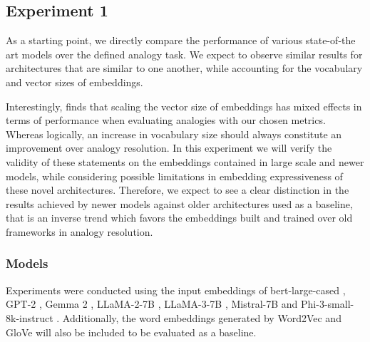 

\subsection{Experiment 1}

As a starting point, we directly compare the performance of various state-of-the art models over the defined analogy task.
We expect to observe similar results for architectures that are similar to one another, while accounting for the vocabulary and vector sizes of embeddings.

Interestingly, \citet{drozd2016} finds that scaling the vector size of embeddings has mixed effects in terms of performance when evaluating analogies with our chosen metrics.
Whereas logically, an increase in vocabulary size should always constitute an improvement over analogy resolution.
In this experiment we will verify the validity of these statements on the embeddings contained in large scale and newer models, while considering possible limitations in embedding expressiveness of these novel architectures.
Therefore, we expect to see a clear distinction in the results achieved by newer models against older architectures used as a baseline, that is an inverse trend which favors the embeddings built and trained over old frameworks in analogy resolution.

\subsubsection{Models}

Experiments were conducted using the input embeddings of bert-large-cased , GPT-2 , Gemma 2 , LLaMA-2-7B , LLaMA-3-7B , Mistral-7B  and Phi-3-small-8k-instruct .
Additionally, the word embeddings generated by Word2Vec  and GloVe  will also be included to be evaluated as a baseline.


